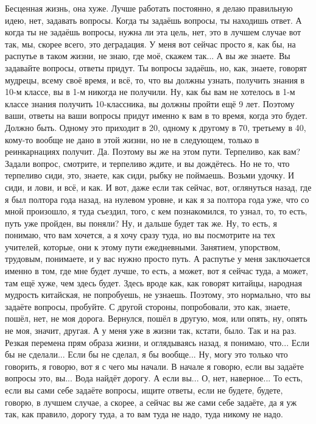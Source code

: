Бесценная жизнь, она хуже.
Лучше работать постоянно, я делаю правильную идею, нет, задавать вопросы.
Когда ты задаёшь вопросы, ты находишь ответ.
А когда ты не задаёшь вопросы, нужна ли эта цель, нет, это в лучшем случае вот так, мы, скорее всего, это деградация.
У меня вот сейчас просто я, как бы, на распутье в таком жизни, не знаю, где моё, скажем так...
А вы же знаете.
Вы задавайте вопросы, ответы придут.
Ты вопросы задаёшь, но, как, знаете, говорят мудрецы, всему своё время, и всё, то, что вы должны узнать, получить знания в 10-м классе, вы в 1-м никогда не получили.
Ну, как бы вам не хотелось в 1-м классе знания получить 10-классника, вы должны пройти ещё 9 лет.
Поэтому ваши, ответы на ваши вопросы придут именно к вам в то время, когда это будет.
Должно быть.
Одному это приходит в 20, одному к другому в 70, третьему в 40, кому-то вообще не дано в этой жизни, но не в следующем, только в реинкарнациях получит.
Да.
Поэтому вы же на этом пути.
Терпеливо, как вам?
Задали вопрос, смотрите, и терпеливо ждите, и вы дождётесь.
Но не то, что терпеливо сиди, это, знаете, как сиди, рыбку не поймаешь.
Возьми удочку.
И сиди, и лови, и всё, и как.
И вот, даже если так сейчас, вот, оглянуться назад, где я был полтора года назад, на нулевом уровне, и как я за полтора года уже, что со мной произошло, я туда съездил, того, с кем познакомился, то узнал, то, то есть, путь уже пройден, вы поняли?
Ну, и дальше будет так же.
Ну, то есть, я понимаю, что вам хочется, а я хочу сразу туда, но вы посмотрите на тех учителей, которые, они к этому пути ежедневными.
Занятием, упорством, трудовым, понимаете, и у вас нужно просто путь.
А распутье у меня заключается именно в том, где мне будет лучше, то есть, а может, вот я сейчас туда, а может, там ещё хуже, чем здесь будет.
Здесь вроде как, как говорят китайцы, народная мудрость китайская, не попробуешь, не узнаешь.
Поэтому, это нормально, что вы задаёте вопросы, пробуйте.
С другой стороны, попробовали, это как, знаете, пошёл, нет, не моя дорога.
Вернулся, пошёл в другую, моя, или опять, ну, опять не моя, значит, другая.
А у меня уже в жизни так, кстати, было.
Так и на раз.
Резкая перемена прям образа жизни, и оглядываясь назад, я понимаю, что...
Если бы не сделали...
Если бы не сделал, я бы вообще...
Ну, могу это только что говорить, я говорю, вот я с чего мы начали.
В начале я говорю, если вы задаёте вопросы это, вы...
Вода найдёт дорогу.
А если вы...
О, нет, наверное...
То есть, если вы сами себе задаёте вопросы, ищите ответы, если не будете, будете, говорю, в лучшем случае, а скорее, а сейчас вы же сами себе задаёте, да я уж так, как правило, дорогу туда, а то вам туда не надо, туда никому не надо.
